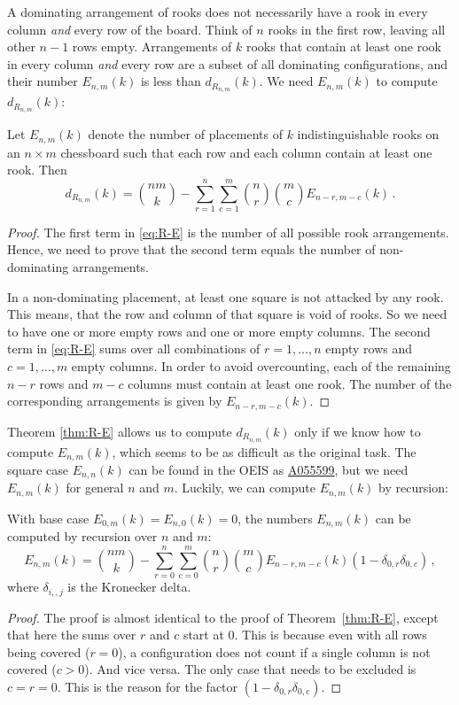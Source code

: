 \documentclass[12pt,reqno]{article}
\newcommand{\seqnum}[1]{\href{https://oeis.org/#1}{\rm \underline{#1}}}
\begin{document}
A dominating arrangement of rooks does not necessarily have a rook in
every column \emph{and} every row of the board. Think of $n$ rooks in the first
row, leaving all other $n-1$ rows empty. Arrangements of $k$ rooks that contain at
least one rook in every column \emph{and} every row are a subset of all
dominating configurations, and their number $E_{n,m}(k)$ is less than $d_{R_{n,m}}(k)$. We need
$E_{n,m}(k)$ to compute $d_{R_{n,m}}(k)$:
\begin{theorem} \label{thm:R-E}
  Let $E_{n,m}(k)$ denote the number of placements of $k$
  indistinguishable rooks on an $n\times m$ chessboard such that each
  row and each column contain at least one rook. Then
  \begin{equation}
    \label{eq:R-E}
    d_{R_{n,m}}(k) = {nm \choose k} - \sum_{r=1}^n \sum_{c=1}^m {n \choose
      r} {m \choose c} E_{n-r,m-c}(k)\,.
  \end{equation}
\end{theorem}
\begin{proof}
  The first term in \eqref{eq:R-E} is the number of all possible rook
  arrangements. Hence, we need to prove that the second term equals
  the number of non-dominating arrangements.

  In a non-dominating placement, at least one square is not attacked
  by any rook. This means, that the row and column of that square is
  void of rooks. So we need to have one or more empty rows and one
  or more empty columns. The second term in \eqref{eq:R-E} sums over all
  combinations of $r=1,\ldots,n$ empty rows and $c=1,\ldots,m$ empty
  columns. In order to avoid overcounting, each of the remaining $n-r$
  rows and $m-c$ columns must contain at least one rook. The number of
  the corresponding arrangements is given by $E_{n-r,m-c}(k)$.
\end{proof}
Theorem \ref{thm:R-E} allows us to compute $d_{R_{n,m}}(k)$ only if we know
how to compute $E_{n,m}(k)$, which seems to be as difficult as the
original task. The square case $E_{n,n}(k)$ can be found in the OEIS
as \seqnum{A055599}, but we need $E_{n,m}(k)$ for general $n$ and $m$.
Luckily, we can compute $E_{n,m}(k)$ by recursion:
\begin{theorem} \label{thm:E-recursion}
  With base case $E_{0,m}(k) = E_{n,0}(k) = 0$, the numbers
  $E_{n,m}(k)$ can be computed by recursion over $n$ and $m$:
  \begin{equation}
    \label{eq:E-recursion}
    E_{n,m}(k) = {nm \choose k} - \sum_{r=0}^n \sum_{c=0}^m {n \choose
      r} {m \choose c} E_{n-r,m-c}(k) (1-\delta_{0,r}\delta_{0,c})\,,
  \end{equation}
  where $\delta_{i,,j}$ is the Kronecker delta.
\end{theorem}
\begin{proof}
  The proof is almost identical to the proof of Theorem~\ref{thm:R-E},
  except that here the sums over $r$ and $c$ start at $0$. This is
  because even with all rows being covered ($r=0$), a configuration
  does not count if a single column is not covered ($c > 0$). And vice
  versa. The only case that needs to be excluded is $c=r=0$. This
  is the reason for the factor $(1-\delta_{0,r}\delta_{0,c})$.
\end{proof}
\end{document}
